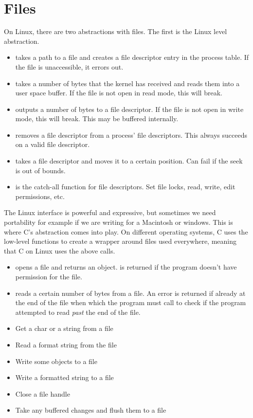\section{Files}

On Linux, there are two abstractions with files. The first is the Linux  level abstraction.

 \begin{itemize}
\item {} takes a path to a file and creates a file descriptor entry in the process table. If the file is unaccessible, it errors out.
\item {} takes a number of bytes that the kernel has received and reads them into a user space buffer. If the file is not open in read mode, this will break.
\item {} outputs a number of bytes to a file descriptor. If the file is not open in write mode, this will break. This may be buffered internally.
\item {} removes a file descriptor from a process' file descriptors. This always succeeds on a valid file descriptor.
\item {} takes a file descriptor and moves it to a certain position. Can fail if the seek is out of bounds.
\item {} is the catch-all function for file descriptors. Set file locks, read, write, edit permissions, etc.
 \end{itemize}

The Linux interface is powerful and expressive, but sometimes we need portability for example if we are writing for a Macintosh or windows.
This is where C's abstraction comes into play.
On different operating systems, C uses the low-level functions to create a wrapper around files used everywhere, meaning that C on Linux uses the above calls.

\begin{itemize}
\item {} opens a file and returns an object.  is returned if the program doesn't have permission for the file.
\item {} reads a certain number of bytes from a file. An error is returned if already at the end of the file when which the program must call  to check if the program attempted to read \textit{past} the end of the file.
\item {} Get a char or a string from a file
\item {} Read a format string from the file
\item {} Write some objects to a file
\item {} Write a formatted string to a file
\item {} Close a file handle
\item {} Take any buffered changes and flush them to a file
\end{itemize}

